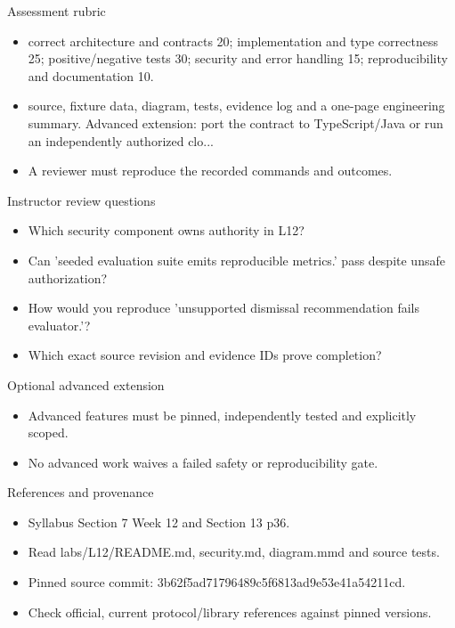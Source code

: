 \documentclass[aspectratio=169,10pt]{beamer}
\begin{document}
\begin{frame}{Assessment rubric}
\small
\begin{itemize}
\item correct architecture and contracts 20; implementation and type correctness 25; positive/negative tests 30; security and error handling 15; reproducibility and documentation 10.
\item source, fixture data, diagram, tests, evidence log and a one-page engineering summary. Advanced extension: port the contract to TypeScript/Java or run an independently authorized clo...
\item A reviewer must reproduce the recorded commands and outcomes.
\end{itemize}

\end{frame}

\begin{frame}{Instructor review questions}
\small
\begin{itemize}
\item Which security component owns authority in L12?
\item Can 'seeded evaluation suite emits reproducible metrics.' pass despite unsafe authorization?
\item How would you reproduce 'unsupported dismissal recommendation fails evaluator.'?
\item Which exact source revision and evidence IDs prove completion?
\end{itemize}

\end{frame}

\begin{frame}{Optional advanced extension}
\small
\begin{itemize}
\item Advanced features must be pinned, independently tested and explicitly scoped.
\item No advanced work waives a failed safety or reproducibility gate.
\end{itemize}

\end{frame}

\begin{frame}{References and provenance}
\small
\begin{itemize}
\item Syllabus Section 7 Week 12 and Section 13 p36.
\item Read labs/L12/README.md, security.md, diagram.mmd and source tests.
\item Pinned source commit: 3b62f5ad71796489c5f6813ad9e53e41a54211cd.
\item Check official, current protocol/library references against pinned versions.
\end{itemize}

\end{frame}
\end{document}
